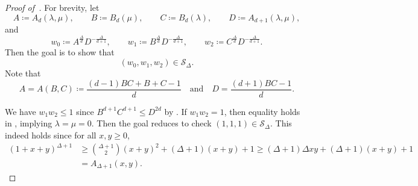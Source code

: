 \documentclass{article}
\numberwithin{equation}{section}
\theoremstyle{plain}
\theoremstyle{definition}
\theoremstyle{remark} %
\newcommand{\defeq}{\coloneqq}
\newcommand{\calS}{\mathcal{S}}
\begin{document}
\begin{proof}[Proof of~]
For brevity, let
\[
    A\defeq A_d(\lambda,\mu),\qquad
    B\defeq B_d(\mu),\qquad
    C\defeq B_d(\lambda),\qquad
    D\defeq A_{d+1}(\lambda,\mu),
\]
and
\begin{equation}\label{eq:wi-written-as-ABCD}
    w_0 \defeq A^{\frac{\Delta}{d}} D^{-\frac{\Delta}{d+1}},
    \qquad
    w_1 \defeq B^{\frac{\Delta}{d}} D^{-\frac{\Delta}{d+1}},
    \qquad
    w_2 \defeq C^{\frac{\Delta}{d}} D^{-\frac{\Delta}{d+1}}.
\end{equation}
Then the goal is to show that
\[
    (w_0,w_1,w_2)\in \calS_\Delta.
\]
Note that
\begin{equation}\label{eq:AD-written-as-BC}
    A=A(B,C)\defeq \frac{(d-1)BC+B+C-1}{d}
    \quad\text{and}\quad
    D=\frac{(d+1)BC-1}{d}.
\end{equation}

We have \(w_1w_2\le 1\) since \(B^{d+1}C^{d+1}\le D^{2d}\) by . If \(w_1w_2=1\), then equality holds in , implying \(\lambda=\mu=0\). Then the goal reduces to check \((1,1,1)\in\calS_\Delta\). This indeed holds since for all \(x,y\ge0\),
\begin{align*}
    (1+x+y)^{\Delta+1}
    &\ge \binom{\Delta+1}{2}(x+y)^2 + (\Delta+1)(x+y) + 1
    \ge (\Delta+1)\Delta xy + (\Delta+1)(x+y) + 1
    \\&= A_{\Delta+1}(x,y).
\end{align*}


\end{proof}
\end{document}
